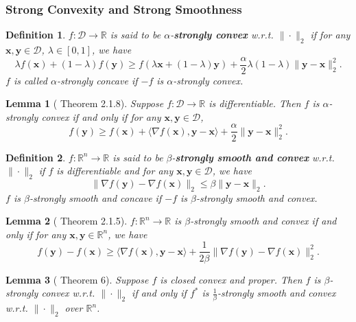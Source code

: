 \documentclass{article}
\newtheorem{definition}{Definition}[section]
\newtheorem{lemma}{Lemma}[section]
\begin{document}
\subsubsection{Strong Convexity and Strong Smoothness}
\begin{definition}
    $f:\mathcal{D}\to \mathbb{R}$ is said to be $\alpha$-\textbf{strongly convex} w.r.t. $\|\cdot\|_2$ if for any $\mathbf{x},\mathbf{y}\in \mathcal{D}$, $\lambda\in[0,1]$, we have
    \begin{equation}
        \lambda f(\mathbf{x})+(1-\lambda)f(\mathbf{y})\ge f(\lambda \mathbf{x}+(1-\lambda)\mathbf{y})+\frac{\alpha}{2}\lambda(1-\lambda)\|\mathbf{y}-\mathbf{x}\|_2^2.
    \end{equation}
    $f$ is called $\alpha$-strongly concave if $-f$ is $\alpha$-strongly convex.
\end{definition}
\begin{lemma}[\cite{N13} Theorem 2.1.8]
    Suppose $f:\mathcal{D}\to \mathbb{R}$ is differentiable. Then $f$ is $\alpha$-strongly convex if and only if for any $\mathbf{x},\mathbf{y}\in \mathcal{D}$,
    \begin{equation}
        f(\mathbf{y})\ge f(\mathbf{x})+\langle\nabla f(\mathbf{x}),\mathbf{y}-\mathbf{x}\rangle+\frac{\alpha}{2}\|\mathbf{y}-\mathbf{x}\|_2^2.
    \end{equation}
\end{lemma}
\begin{definition}\label{strongSmooth}
    $f:\mathbb{R}^n\to \mathbb{R}$ is said to be $\beta$-\textbf{strongly smooth and convex} w.r.t. $\|\cdot\|_2$ if $f$ is differentiable and for any $\mathbf{x},\mathbf{y}\in \mathcal{D}$, we have
    \begin{equation}
        \|\nabla f(\mathbf{y})-\nabla f(\mathbf{x})\|_2\le\beta\|\mathbf{y}-\mathbf{x}\|_2.
    \end{equation}
    $f$ is $\beta$-strongly smooth and concave if $-f$ is $\beta$-strongly smooth and convex.
\end{definition}
\begin{lemma}[\cite{N13} Theorem 2.1.5]\label{strongSmoothEquiv}
    $f:\mathbb{R}^n\to \mathbb{R}$ is $\beta$-strongly smooth and convex if and only if for any $\mathbf{x},\mathbf{y}\in \mathbb{R}^n$, we have
    \begin{equation}
        f(\mathbf{y})-f(\mathbf{x})\ge \langle\nabla f(\mathbf{x}),\mathbf{y}-\mathbf{x}\rangle+\frac{1}{2\beta}\|\nabla f(\mathbf{y})-\nabla f(\mathbf{x})\|_2^2.
    \end{equation}
\end{lemma}
\begin{lemma}[\cite{KST09} Theorem 6]\label{strongConvSmoothDual}
    Suppose $f$ is closed convex and proper. Then $f$ is $\beta$-strongly convex w.r.t. $\|\cdot\|_2$ if and only if $f^*$ is $\frac{1}{\beta}$-strongly smooth and convex w.r.t. $\|\cdot\|_2$ over $\mathbb{R}^n$.
\end{lemma}
\end{document}

